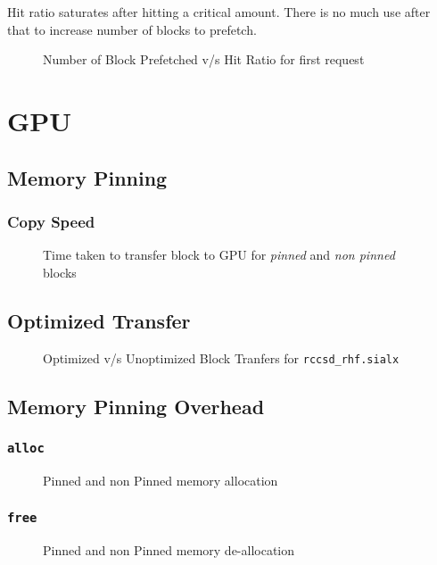 Hit ratio saturates after hitting a critical amount. There is no much use after
that to increase number of blocks to prefetch.
\begin{figure}[h]
  
  \caption{Number of Block Prefetched v/s Hit Ratio for first request}
\end{figure}

\section{GPU}
\subsection{Memory Pinning}
\subsubsection{Copy Speed}
\begin{figure}[h]
  
  \caption{Time taken to transfer block to GPU for \textit{pinned} and \textit{non pinned} blocks}
\end{figure}
\subsection{Optimized Transfer}
\begin{figure}[h]
  
  \caption{Optimized v/s Unoptimized Block Tranfers for \texttt{rccsd\_rhf.sialx}}
\end{figure}

\subsection{Memory Pinning Overhead}
\subsubsection{\texttt{alloc}}
\begin{figure}[h]
  
  \caption{Pinned and non Pinned memory allocation}
\end{figure}

\subsubsection{\texttt{free}}
\begin{figure}[h]
  
  \caption{Pinned and non Pinned memory de-allocation}
\end{figure}